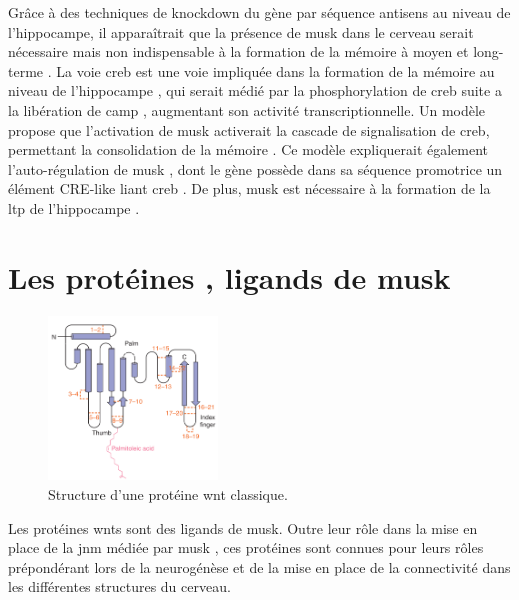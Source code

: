 	Grâce à des techniques de knockdown du gène par séquence antisens au niveau de l'hippocampe, il apparaîtrait que la présence de \gls{musk} dans le cerveau serait nécessaire mais non indispensable à la formation de la mémoire à moyen et long-terme \cite{Garcia-Osta2006}. La voie \gls{creb} est une voie impliquée dans la formation de la mémoire au niveau de l'hippocampe \cite{Silva1998, Kandel2012,Kida2014,Ortega-Martinez2015}, qui serait médié par la phosphorylation de \gls{creb} suite a la libération de \acrshort{camp} , augmentant son activité transcriptionnelle. Un modèle propose que l'activation de \gls{musk} activerait la cascade de signalisation de \gls{creb}, permettant la consolidation de la mémoire \cite{Garcia-Osta2006} . Ce modèle expliquerait également l'auto-régulation de \gls{musk} \cite{Moore2001}, dont le gène possède dans sa séquence promotrice un élément CRE-like liant \gls{creb} \cite{Kim2005}. De plus, \gls{musk} est nécessaire à la formation de la \gls{ltp} de l'hippocampe \cite{Garcia-Osta2006}.

\section{Les protéines , ligands de \acrshort{musk}}
\label{sec:IntroWnt}	
	\begin{figure}
		\includegraphics[width=0.4\textwidth]{./Images/WntProtein.png}	
		\caption{Structure d'une protéine \Gls{wnt} classique.}
		\label{fig:WntProt}
	\end{figure}
	
	Les protéines \glspl{wnt} sont des ligands de \gls{musk}. Outre leur rôle dans la mise en place de la \gls{jnm} médiée par \gls{musk} \cite{Hall2000}, ces protéines sont connues pour leurs rôles prépondérant lors de la neurogénèse et de la mise en place de la connectivité dans les différentes structures du cerveau.
	

